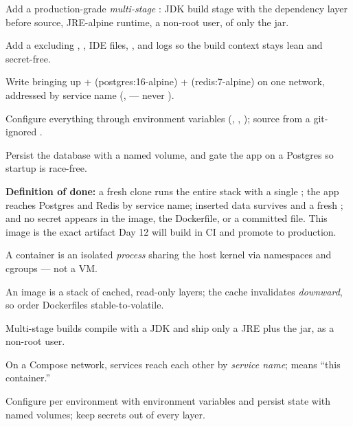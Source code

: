 \begin{buildalong}
\begin{wbitem}
  \item Add a production-grade \emph{multi-stage} : JDK build stage with the dependency layer before source, JRE-alpine runtime, a non-root  user,  of only the jar.
  \item Add a  excluding , , IDE files, , and logs so the build context stays lean and secret-free.
  \item Write  bringing up  +  (postgres:16-alpine) +  (redis:7-alpine) on one network, addressed by service name (,  --- never ).
  \item Configure everything through environment variables (, , ); source  from a git-ignored .
  \item Persist the database with a named  volume, and gate the app on a Postgres  so startup is race-free.
\end{wbitem}
\smallskip\textbf{Definition of done:} a fresh clone runs the entire stack with a single ; the app reaches Postgres and Redis by service name; inserted data survives  and a fresh ; and no secret appears in the image, the Dockerfile, or a committed file. This image is the exact artifact Day 12 will build in CI and promote to production.
\end{buildalong}


\begin{tickcheck}
  \item A container is an isolated \emph{process} sharing the host kernel via namespaces and cgroups --- not a VM.
  \item An image is a stack of cached, read-only layers; the cache invalidates \emph{downward}, so order Dockerfiles stable-to-volatile.
  \item Multi-stage builds compile with a JDK and ship only a JRE plus the jar, as a non-root user.
  \item On a Compose network, services reach each other by \emph{service name};  means ``this container.''
  \item Configure per environment with environment variables and persist state with named volumes; keep secrets out of every layer.
\end{tickcheck}

